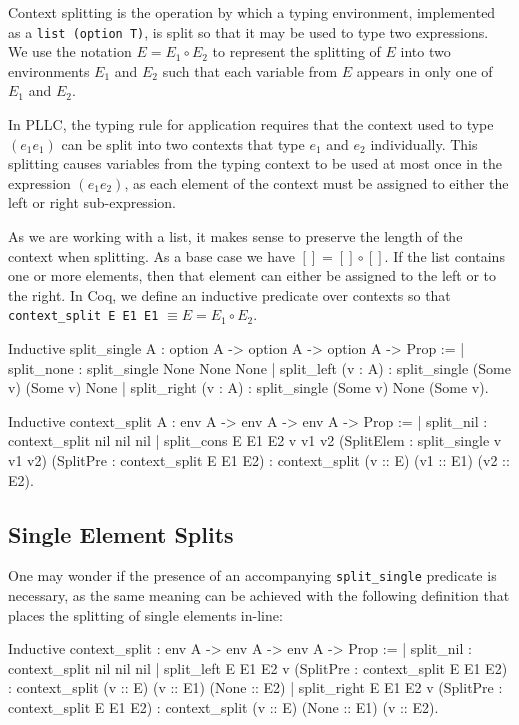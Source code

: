 \documentclass[]{unswthesis}
\let\c\texttt
\begin{document}
Context splitting is the operation by which a typing environment, implemented as a \c{list (option T)}, is split so that it may be used to type two expressions. We use the notation $E = E_1 \circ E_2$ to represent the splitting of $E$ into two environments $E_1$ and $E_2$ such that each variable from $E$ appears in only one of $E_1$ and $E_2$.

In PLLC, the typing rule for application requires that the context used to type $(e_1 e_1)$ can be split into two contexts that type $e_1$ and $e_2$ individually. This splitting causes variables from the typing context to be used at most once in the expression $(e_1 e_2)$, as each element of the context must be assigned to either the left or right sub-expression.

As we are working with a list, it makes sense to preserve the length of the context when splitting. As a base case we have $[] = [] \circ []$. If the list contains one or more elements, then that element can either be assigned to the left or to the right. In Coq, we define an inductive predicate over contexts so that \c{context_split E E1 E1} $\equiv E = E_1 \circ E_2$.

\begin{coqcode}
Inductive split_single {A} : option A -> option A -> option A -> Prop :=
  | split_none : split_single None None None
  | split_left (v : A) : split_single (Some v) (Some v) None
  | split_right (v : A) : split_single (Some v) None (Some v).

Inductive context_split {A} : env A -> env A -> env A -> Prop :=
  | split_nil : context_split nil nil nil
  | split_cons E E1 E2 v v1 v2
      (SplitElem : split_single v v1 v2)
      (SplitPre : context_split E E1 E2) :
      context_split (v :: E) (v1 :: E1) (v2 :: E2).
\end{coqcode}

\subsection{Single Element Splits}

One may wonder if the presence of an accompanying \c{split_single} predicate is necessary, as the same meaning can be achieved with the following definition that places the splitting of single elements in-line:

\begin{coqcode}
Inductive context_split : env A -> env A -> env A -> Prop :=
  | split_nil : context_split nil nil nil
  | split_left E E1 E2 v
  	  (SplitPre : context_split E E1 E2) :
  	  context_split (v :: E) (v :: E1) (None :: E2)
  | split_right E E1 E2 v
  	  (SplitPre : context_split E E1 E2) :
  	  context_split (v :: E) (None :: E1) (v :: E2).
\end{coqcode}
\end{document}
